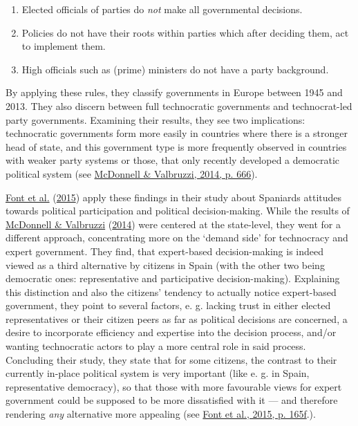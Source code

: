 \documentclass[
  12pt,
  english,
]{article}
\providecommand{\tightlist}{%
  \setlength{\itemsep}{0pt}\setlength{\parskip}{0pt}}
\begin{document}
\begin{enumerate}
\def\labelenumi{\arabic{enumi}.}
\tightlist
\item
  Elected officials of parties do \emph{not} make all governmental
  decisions.
\item
  Policies do not have their roots within parties which after deciding
  them, act to implement them.
\item
  High officials such as (prime) ministers do not have a party
  background.
\end{enumerate}

By applying these rules, they classify governments in Europe between
1945 and 2013. They also discern between full technocratic governments
and technocrat-led party governments. Examining their results, they see
two implications: technocratic governments form more easily in countries
where there is a stronger head of state, and this government type is
more frequently observed in countries with weaker party systems or
those, that only recently developed a democratic political system (see
\protect\hyperlink{ref-mcdonnell2014defining}{McDonnell \& Valbruzzi,
2014, p. 666}).

\protect\hyperlink{ref-font2015participation}{Font et al.}
(\protect\hyperlink{ref-font2015participation}{2015}) apply these
findings in their study about Spaniards attitudes towards political
participation and political decision-making. While the results of
\protect\hyperlink{ref-mcdonnell2014defining}{McDonnell \& Valbruzzi}
(\protect\hyperlink{ref-mcdonnell2014defining}{2014}) were centered at
the state-level, they went for a different approach, concentrating more
on the `demand side' for technocracy and expert government. They find,
that expert-based decision-making is indeed viewed as a third
alternative by citizens in Spain (with the other two being democratic
ones: representative and participative decision-making). Explaining this
distinction and also the citizens' tendency to actually notice
expert-based government, they point to several factors, e. g. lacking
trust in either elected representatives or their citizen peers as far as
political decisions are concerned, a desire to incorporate efficiency
and expertise into the decision process, and/or wanting technocratic
actors to play a more central role in said process. Concluding their
study, they state that for some citizens, the contrast to their
currently in-place political system is very important (like e. g. in
Spain, representative democracy), so that those with more favourable
views for expert government could be supposed to be more dissatisfied
with it --- and therefore rendering \emph{any} alternative more
appealing (see \protect\hyperlink{ref-font2015participation}{Font et
al., 2015, p. 165f}.).
\end{document}
